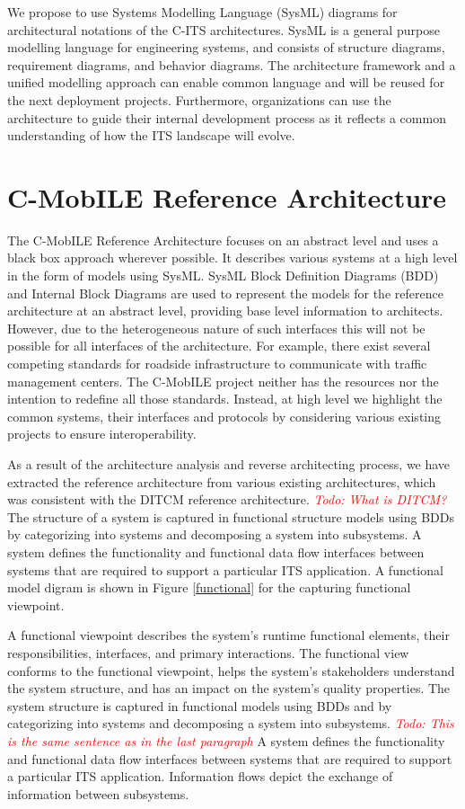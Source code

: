 \documentclass[conference]{IEEEtran}
\newcommand{\todo}[1]{\textcolor{red}{\emph{Todo: #1}}}
\begin{document}
We propose to use Systems Modelling Language (SysML) diagrams for architectural notations of the C-ITS architectures.
SysML is a general purpose modelling language for engineering systems, and consists of structure diagrams, requirement diagrams, and behavior diagrams.
The architecture framework and a unified modelling approach can enable common language and will be reused for the next deployment projects.
Furthermore, organizations can use the architecture to guide their internal development process as it reflects a common understanding of how the ITS landscape will evolve.


\section{C-MobILE Reference Architecture}
\label{secCMobILEReferenceArchitecture}

The C-MobILE Reference Architecture focuses on an abstract level and uses a black box approach wherever possible.
It describes various systems at a high level in the form of models using SysML.
SysML Block Definition Diagrams (BDD) and Internal Block Diagrams are used to represent the models for the reference architecture at an abstract level, providing base level information to architects.
However, due to the heterogeneous nature of such interfaces this will not be possible for all interfaces of the architecture.
For example, there exist several competing standards for roadside infrastructure to communicate with traffic management centers.
The C-MobILE project neither has the resources nor the intention to redefine all those standards.
Instead, at high level we highlight the common systems, their interfaces and protocols by considering various existing projects to ensure interoperability.

As a result of the architecture analysis and reverse architecting process, we have extracted the reference architecture from various existing architectures, which was consistent with the DITCM reference architecture. \todo{What is DITCM?}
The structure of a system is captured in functional structure models using BDDs by categorizing into systems and decomposing a system into subsystems.
A system defines the functionality and functional data flow interfaces between systems that are required to support a particular ITS application.
A functional model digram is shown in Figure \ref{functional} for the capturing functional viewpoint.



A functional viewpoint describes the system's runtime functional elements, their responsibilities, interfaces, and primary interactions.
The functional view conforms to the functional viewpoint, helps the system's stakeholders understand the system structure, and has an impact on the system's quality properties.
The system structure is captured in functional models using BDDs and by categorizing into systems and decomposing a system into subsystems. \todo{This is the same sentence as in the last paragraph}
A system defines the functionality and functional data flow interfaces between systems that are required to support a particular ITS application.
Information flows depict the exchange of information between subsystems.
\end{document}
